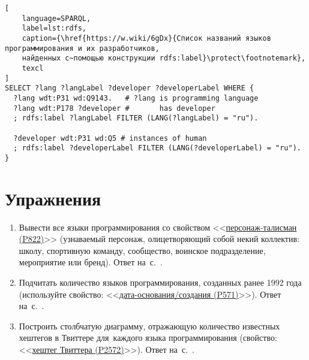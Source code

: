 \begin{lstlisting}[
	language=SPARQL,
	label=lst:rdfs,
	caption={\href{https://w.wiki/6gDx}{Список названий языков программирования и их разработчиков, 
    найденных с~помощью конструкции rdfs:label}\protect\footnotemark},
	texcl
]
SELECT ?lang ?langLabel ?developer ?developerLabel WHERE {
  ?lang wdt:P31 wd:Q9143.   # ?lang is programming language
  ?lang wdt:P178 ?developer #       has developer
  ; rdfs:label ?langLabel FILTER (LANG(?langLabel) = "ru").
  
  ?developer wdt:P31 wd:Q5 # instances of human
  ; rdfs:label ?developerLabel FILTER (LANG(?developerLabel) = "ru").
}
\end{lstlisting}


\section{Упражнения}
\label{prog_lang_test}
\begin{enumerate}
	\item Вывести все языки программирования со свойством <<\href{https://www.wikidata.org/wiki/Property:P822}{персонаж-талисман (P822)}>> (узнаваемый персонаж, олицетворяющий собой некий коллектив: школу, спортивную команду, сообщество, воинское подразделение, мероприятие или бренд).
Ответ на~с.~\pageref{answer:prog_langs_4}.

	\item Подчитать количество языков программирования, созданных ранее 1992 года (используйте свойство: <<\href{https://www.wikidata.org/wiki/Property:P571}{дата-основания/создания (P571)}>>).
Ответ на~с.~\pageref{answer:prog_langs_4}.

%
	\item Построить столбчатую диаграмму, отражающую количество известных хештегов в Твиттере 
        для~каждого языка программирования (свойство: <<\href{https://www.wikidata.org/wiki/Property:P2572}{хештег Твиттера (P2572)}>>).
Ответ на~с.~\pageref{answer:prog_langs_4}.
\end{enumerate}
